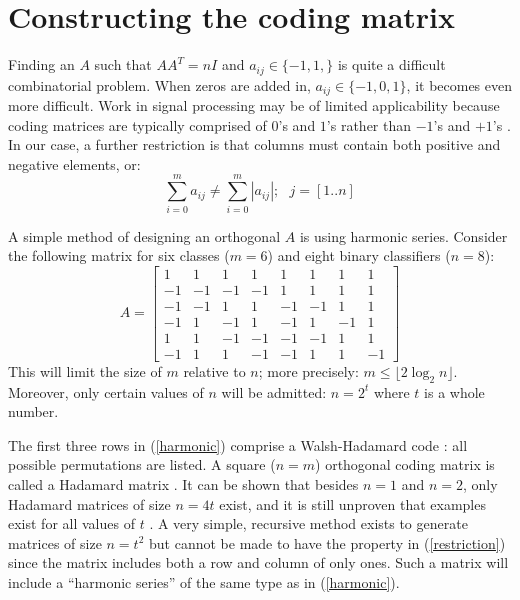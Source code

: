 \section{Constructing the coding matrix}

\label{construction}

Finding an $A$ such that $A A^T = n I$ and $a_{ij} \in \lbrace -1, 1, \rbrace$
is quite a difficult combinatorial problem.
{\revision When zeros are added in, $a_{ij}\in \lbrace -1, 0, 1\rbrace$,
it becomes even more difficult.}
Work in signal processing may be of limited applicability because coding
matrices are typically comprised of $0$'s and $1$'s 
rather than $-1$'s and $+1$'s \citep{Hedayat_etal1999,Panse_etal2014}.
In our case, a further restriction is that
columns must contain both positive and negative elements, or:
\begin{equation}
	\sum_{i=0}^m a_{ij} \ne \sum_{i=0}^m |a_{ij}|;  ~~~ j=[1..n] \label{restriction}
\end{equation}

A simple method of designing an orthogonal $A$ is using harmonic series.
Consider the following matrix for six classes ($m=6$) 
and eight binary classifiers ($n=8$):
\begin{equation}
	A = \left [ \begin{array}{rrrrrrrr}
			 1 & 1 & 1 & 1 & 1 & 1 & 1 & 1 \\
			-1 & -1 & -1 & -1 & 1 & 1 & 1 & 1 \\
			-1 & -1 & 1 & 1 & -1 & -1 & 1 & 1 \\
			-1 & 1 & -1 & 1 & -1 & 1 & -1 & 1 \\
			 1 &  1 & -1 & -1 & -1 & -1 & 1 & 1 \\
			-1 & 1 & 1 & -1 & -1 & 1 & 1 & -1 
	\end{array} \right ]
	\label{harmonic}
\end{equation}
This will limit the size of $m$ relative to $n$; more precisely:
$m \le \lfloor 2 \log_2 n \rfloor$. Moreover, only certain values of $n$
will be admitted: $n=2^t$ where $t$ is a whole number.

The first three rows in (\ref{harmonic}) comprise a Walsh-Hadamard code \citep{Arora_Barak2009}:
all possible permutations are listed.
A square ($n=m$) orthogonal coding matrix is called a Hadamard matrix
\citep{Sylvester1867}.
It can be shown that besides $n=1$ and $n=2$, only Hadamard matrices of size
$n=4t$ exist,  
and it is still unproven that examples exist for all values of $t$
\citep{Hedayat_Wallis1978}.
A very simple, recursive method exists to generate matrices of size $n=t^2$ 
\citep{Hedayat_Wallis1978} but cannot be made to have the property in (\ref{restriction})
since the matrix includes both a row and column of only ones.
Such a matrix will include a ``harmonic series'' of the same type as in
(\ref{harmonic}).

